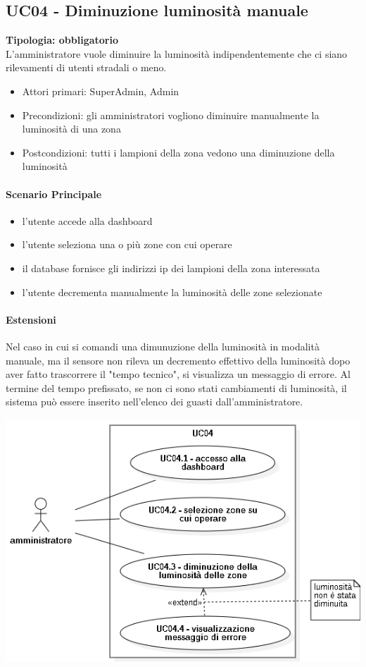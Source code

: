 \documentclass[12pt]{article}
\begin{document}
\subsection{UC04 - Diminuzione luminosità manuale}
\textbf{Tipologia: obbligatorio} \\
L'amministratore vuole diminuire la luminosità indipendentemente che ci siano rilevamenti di utenti stradali o meno.
\begin{itemize}
	\item Attori primari: SuperAdmin, Admin
	\item Precondizioni: gli amministratori vogliono diminuire manualmente la luminosità di una zona
	\item Postcondizioni: tutti i lampioni della zona vedono una diminuzione della luminosità
\end{itemize}
\paragraph{Scenario Principale}
\begin{itemize}
	\item l'utente accede alla dashboard
	\item l'utente seleziona una o più zone con cui operare
 	\item il database fornisce gli indirizzi ip dei lampioni della zona interessata
	\item l'utente decrementa manualmente la luminosità delle zone selezionate
\end{itemize}
\paragraph{Estensioni} Nel caso in cui si comandi una dimunuzione della luminosità in modalità manuale, ma il sensore non rileva un decremento effettivo della luminosità dopo aver fatto trascorrere il "tempo tecnico", si visualizza un messaggio di errore.
Al termine del tempo prefissato, se non ci sono stati cambiamenti di luminosità, il sistema può essere inserito nell'elenco dei guasti dall'amministratore.

\includegraphics[scale=0.5]{UC04.png}
\end{document}
